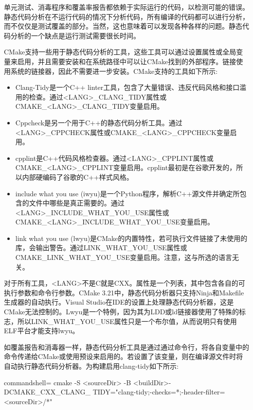 单元测试、消毒程序和覆盖率报告都依赖于实际运行的代码，以检测可能的错误。静态代码分析在不运行代码的情况下分析代码，所有编译的代码都可以进行分析，而不仅仅是测试覆盖的部分。当然，这也意味着可以发现各种各样的问题。静态代码分析的一个缺点是运行测试需要很长时间。

CMake支持一些用于静态代码分析的工具，这些工具可以通过设置属性或全局变量来启用，并且需要安装和在系统路径中可以让CMake找到的外部程序。链接使用系统的链接器，因此不需要进一步安装。CMake支持的工具如下所示:

\begin{itemize}
\item 
Clang-Tidy是一个C++ linter工具，包含了大量错误、违反代码风格和接口滥用的检查。通过<LANG>\_CLANG\_TIDY属性或CMAKE\_<LANG>\_CLANG\_TIDY变量启用。

\item 
Cppcheck是另一个用于C++的静态代码分析工具。通过<LANG>\_CPPCHECK属性或CMAKE\_<LANG>\_CPPCHECK变量启用。

\item 
cpplint是C++代码风格检查器。通过<LANG>\_CPPLINT属性或CMAKE\_<LANG>\_CPPLINT变量启用。cpplint最初是在谷歌开发的，所以内部硬编码了谷歌的C++样式风格。

\item 
include what you use (iwyu)是一个Python程序，解析C++源文件并确定所包含的文件中哪些是真正需要的。通过<LANG>\_INCLUDE\_WHAT\_YOU\_USE属性或CMAKE\_<LANG>\_INCLUDE\_WHAT\_YOU\_USE变量启用。

\item 
link what you use (lwyu)是CMake的内置特性，若可执行文件链接了未使用的库，会输出警告。通过LINK\_WHAT\_YOU\_USE属性或CMAKE\_LINK\_WHAT\_YOU\_USE变量启用。注意，这与所选的语言无关。
\end{itemize}

对于所有工具，<LANG>不是C就是CXX。属性是一个列表，其中包含各自的可执行参数和命令行参数。CMake 3.21中，静态代码分析器只支持Ninja和Makefile生成器的自动执行。Visual Studio在IDE的设置上处理静态代码分析器，这是CMake无法控制的。Lwyu是一个特例，因为其为LDD或ld链接器使用了特殊的标志，所以LINK\_WHAT\_YOU\_USE属性只是一个布尔值，从而说明只有使用ELF平台才能支持lwyu。

如覆盖报告和消毒器一样，静态代码分析工具是通过通过命令行，将各自变量中的命令传递给CMake或使用预设来启用的。若设置了该变量，则在编译源文件时将自动执行静态代码分析器。为构建启用clang-tidy如下所示:

\begin{tcblisting}{commandshell={}}
cmake -S <sourceDir> -B <buildDir>-DCMAKE_CXX_CLANG_
  TIDY="clang-tidy;-checks=*;-header-filter=<sourceDir>/*"
\end{tcblisting}

